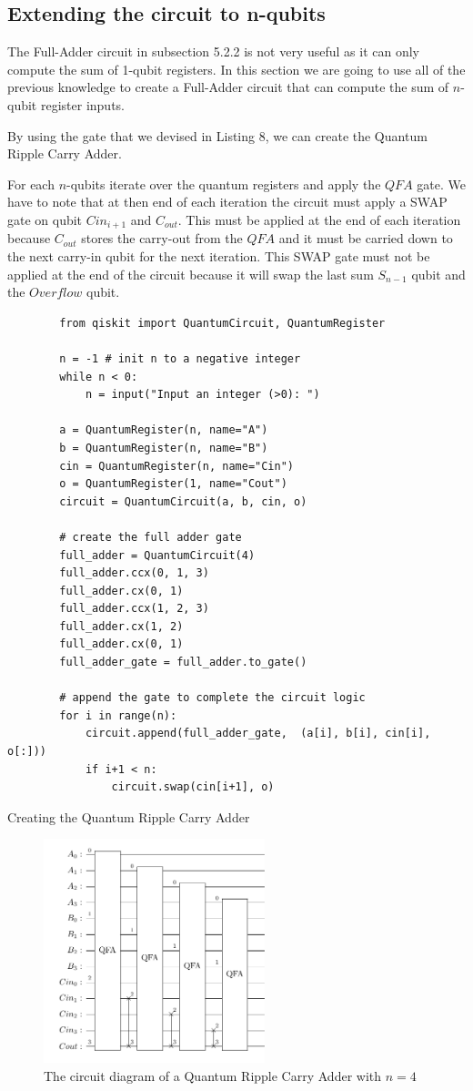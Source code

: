 \subsection{Extending the circuit to n-qubits}

The Full-Adder circuit in subsection 5.2.2 is not very useful as it can only compute the sum of 1-qubit registers. In this section
we are going to use all of the previous knowledge to create a Full-Adder circuit that can compute the sum of $n$-qubit register inputs.

By using the gate that we devised in Listing 8, we can create the Quantum Ripple Carry Adder.

For each $n$-qubits iterate over the quantum registers and apply the $QFA$ gate. We have to note that at then end of each iteration
the circuit must apply a SWAP gate on qubit $Cin_{i+1}$ and $C_{out}$. This must be applied at the end of each iteration because
$C_{out}$ stores the carry-out from the $QFA$ and it must be carried down to the next carry-in qubit for the next iteration. This
SWAP gate must not be applied at the end of the circuit because it will swap the last sum $S_{n-1}$ qubit and the $Overflow$ qubit.

\begin{listing}[ht]
    \centering
    \begin{verbatim}
        from qiskit import QuantumCircuit, QuantumRegister

        n = -1 # init n to a negative integer
        while n < 0:
            n = input("Input an integer (>0): ")

        a = QuantumRegister(n, name="A")
        b = QuantumRegister(n, name="B")
        cin = QuantumRegister(n, name="Cin")
        o = QuantumRegister(1, name="Cout")
        circuit = QuantumCircuit(a, b, cin, o)

        # create the full adder gate
        full_adder = QuantumCircuit(4)
        full_adder.ccx(0, 1, 3)
        full_adder.cx(0, 1)
        full_adder.ccx(1, 2, 3)
        full_adder.cx(1, 2)
        full_adder.cx(0, 1)
        full_adder_gate = full_adder.to_gate()

        # append the gate to complete the circuit logic
        for i in range(n):
            circuit.append(full_adder_gate,  (a[i], b[i], cin[i], o[:]))
            if i+1 < n:
                circuit.swap(cin[i+1], o)
    \end{verbatim}
    \caption{Creating the Quantum Ripple Carry Adder}
\end{listing}

\begin{figure}[!ht]
    \centering
    \includegraphics[height=6.5cm]{images/5_Implementation/quantum_ripple_carry_adder.pdf}
    \caption{The circuit diagram of a Quantum Ripple Carry Adder with $n=4$}
\end{figure}
